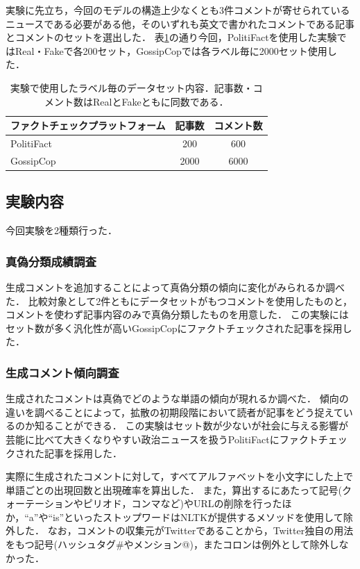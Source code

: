実験に先立ち，今回のモデルの構造上少なくとも3件コメントが寄せられているニュースである必要がある他，そのいずれも英文で書かれたコメントである記事とコメントのセットを選出した．
表\ref{tbl:dataset}の通り今回，PolitiFactを使用した実験ではReal・Fakeで各200セット，GossipCopでは各ラベル毎に2000セット使用した．

\begin{table}[p]
    \caption{実験で使用したラベル毎のデータセット内容．記事数・コメント数はRealとFakeともに同数である．}
    \label{tbl:dataset}
    \centering
    \begin{tabular}{lcc}
        \hline
        ファクトチェックプラットフォーム     & 記事数 & コメント数 \\ \hline
        PolitiFact & 200   & 600   \\
        GossipCop  & 2000  & 6000  \\ \hline
    \end{tabular}
\end{table}

\subsection{実験内容}
\label{sec:exp_contents}
今回実験を2種類行った．

\subsubsection{真偽分類成績調査}
生成コメントを追加することによって真偽分類の傾向に変化がみられるか調べた．
比較対象として2件ともにデータセットがもつコメントを使用したものと，コメントを使わず記事内容のみで真偽分類したものを用意した．
この実験にはセット数が多く汎化性が高いGossipCopにファクトチェックされた記事を採用した．

\subsubsection{生成コメント傾向調査}
生成されたコメントは真偽でどのような単語の傾向が現れるか調べた．
傾向の違いを調べることによって，拡散の初期段階において読者が記事をどう捉えているのか知ることができる．
この実験はセット数が少ないが社会に与える影響が芸能に比べて大きくなりやすい政治ニュースを扱うPolitiFactにファクトチェックされた記事を採用した．

実際に生成されたコメントに対して，すべてアルファベットを小文字にした上で単語ごとの出現回数と出現確率を算出した．
また，算出するにあたって記号(クォーテーションやピリオド，コンマなど)やURLの削除を行ったほか，``a''や``is''といったストップワードはNLTK\cite{bird-loper-2004-nltk}が提供するメソッドを使用して除外した．
なお，コメントの収集元がTwitterであることから，Twitter独自の用法をもつ記号(ハッシュタグ\#やメンション@)，またコロンは例外として除外しなかった．

